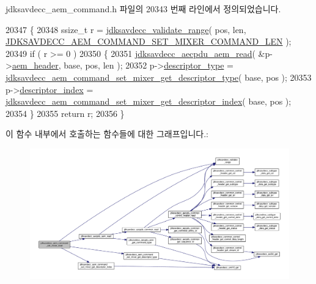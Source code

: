 jdksavdecc\+\_\+aem\+\_\+command.\+h 파일의 20343 번째 라인에서 정의되었습니다.


\begin{DoxyCode}
20347 \{
20348     ssize\_t r = \hyperlink{group__util_ga9c02bdfe76c69163647c3196db7a73a1}{jdksavdecc\_validate\_range}( pos, len, 
      \hyperlink{group__command__set__mixer_ga99895088fc524d7953bca73a5d1f4bf9}{JDKSAVDECC\_AEM\_COMMAND\_SET\_MIXER\_COMMAND\_LEN} );
20349     \textcolor{keywordflow}{if} ( r >= 0 )
20350     \{
20351         \hyperlink{group__aecpdu__aem_gae2421015dcdce745b4f03832e12b4fb6}{jdksavdecc\_aecpdu\_aem\_read}( &p->\hyperlink{structjdksavdecc__aem__command__set__mixer_ae1e77ccb75ff5021ad923221eab38294}{aem\_header}, base, pos, len );
20352         p->\hyperlink{structjdksavdecc__aem__command__set__mixer_ab7c32b6c7131c13d4ea3b7ee2f09b78d}{descriptor\_type} = 
      \hyperlink{group__command__set__mixer_ga3c8af464ce6b0f067aa58b6607e154ce}{jdksavdecc\_aem\_command\_set\_mixer\_get\_descriptor\_type}( 
      base, pos );
20353         p->\hyperlink{structjdksavdecc__aem__command__set__mixer_a042bbc76d835b82d27c1932431ee38d4}{descriptor\_index} = 
      \hyperlink{group__command__set__mixer_ga4f7825aeba5cf809dd446b2304e15f31}{jdksavdecc\_aem\_command\_set\_mixer\_get\_descriptor\_index}(
       base, pos );
20354     \}
20355     \textcolor{keywordflow}{return} r;
20356 \}
\end{DoxyCode}


이 함수 내부에서 호출하는 함수들에 대한 그래프입니다.\+:
\nopagebreak
\begin{figure}[H]
\begin{center}
\leavevmode
\includegraphics[width=350pt]{group__command__set__mixer_gaa371a45c5c5a358553b9b111ae90258e_cgraph}
\end{center}
\end{figure}


